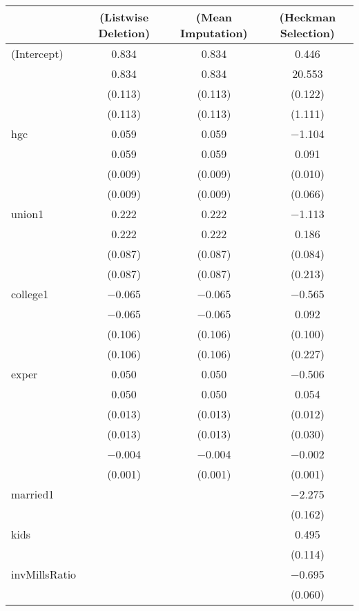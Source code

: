 \documentclass{article}
\begin{document}
\begin{table}
\centering
\begin{tabular}[t]{lccc}
\toprule
  & (Listwise Deletion) & (Mean Imputation) & (Heckman Selection)\\
\midrule
(Intercept) & \num{0.834} & \num{0.834} & \num{0.446}\\
 & \num{0.834} & \num{0.834} & \num{20.553}\\
 & (\num{0.113}) & (\num{0.113}) & (\num{0.122})\\
 & (\num{0.113}) & (\num{0.113}) & (\num{1.111})\\
hgc & \num{0.059} & \num{0.059} & \num{-1.104}\\
 & \num{0.059} & \num{0.059} & \num{0.091}\\
 & (\num{0.009}) & (\num{0.009}) & (\num{0.010})\\
 & (\num{0.009}) & (\num{0.009}) & (\num{0.066})\\
union1 & \num{0.222} & \num{0.222} & \num{-1.113}\\
 & \num{0.222} & \num{0.222} & \num{0.186}\\
 & (\num{0.087}) & (\num{0.087}) & (\num{0.084})\\
 & (\num{0.087}) & (\num{0.087}) & (\num{0.213})\\
college1 & \num{-0.065} & \num{-0.065} & \num{-0.565}\\
 & \num{-0.065} & \num{-0.065} & \num{0.092}\\
 & (\num{0.106}) & (\num{0.106}) & (\num{0.100})\\
 & (\num{0.106}) & (\num{0.106}) & (\num{0.227})\\
exper & \num{0.050} & \num{0.050} & \num{-0.506}\\
 & \num{0.050} & \num{0.050} & \num{0.054}\\
 & (\num{0.013}) & (\num{0.013}) & (\num{0.012})\\
 & (\num{0.013}) & (\num{0.013}) & (\num{0.030})\\
 & \num{-0.004} & \num{-0.004} & \num{-0.002}\\
 & (\num{0.001}) & (\num{0.001}) & (\num{0.001})\\
married1 &  &  & \num{-2.275}\\
 &  &  & (\num{0.162})\\
kids &  &  & \num{0.495}\\
 &  &  & (\num{0.114})\\
invMillsRatio &  &  & \num{-0.695}\\
 &  &  & (\num{0.060})\\

\end{tabular}
\end{table}
\end{document}
